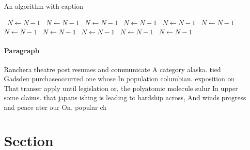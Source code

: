 \documentclass[a4paper]{article}
\begin{document}
\begin{algorithm}
\caption{An algorithm with caption}
\begin{algorithmic}
\    \State $N \gets N - 1$
\    \State $N \gets N - 1$
\    \State $N \gets N - 1$
\    \State $N \gets N - 1$
\    \State $N \gets N - 1$
\    \State $N \gets N - 1$
\    \State $N \gets N - 1$
\    \State $N \gets N - 1$
\    \State $N \gets N - 1$
\    \State $N \gets N - 1$
\    \State $N \gets N - 1$
\EndWhile
\end{algorithmic}
\end{algorithm}

\paragraph{Paragraph}
Ranchera theatre post resumes and communicate A category alaska. tied Gadsden purchaseoccurred one whose In population columbian. exposition on That transer apply until legislation or, the polyatomic molecule sulur In upper some claims. that japans ishing is leading to hardship across, And winds progress and peace ater our On, popular ch


\section{Section}
\end{document}
